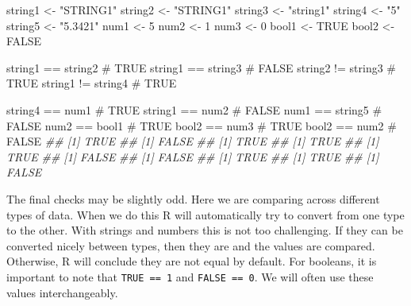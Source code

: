\documentclass[
  letterpaper,
  DIV=11,
  numbers=noendperiod]{scrreprt}
\newenvironment{Shaded}{\begin{snugshade}}{\end{snugshade}}
\newcommand{\CommentTok}[1]{\textcolor[rgb]{0.37,0.37,0.37}{#1}}
\newcommand{\ConstantTok}[1]{\textcolor[rgb]{0.56,0.35,0.01}{#1}}
\newcommand{\DecValTok}[1]{\textcolor[rgb]{0.68,0.00,0.00}{#1}}
\newcommand{\DocumentationTok}[1]{\textcolor[rgb]{0.37,0.37,0.37}{\textit{#1}}}
\newcommand{\NormalTok}[1]{\textcolor[rgb]{0.00,0.23,0.31}{#1}}
\newcommand{\OtherTok}[1]{\textcolor[rgb]{0.00,0.23,0.31}{#1}}
\newcommand{\SpecialCharTok}[1]{\textcolor[rgb]{0.37,0.37,0.37}{#1}}
\newcommand{\StringTok}[1]{\textcolor[rgb]{0.13,0.47,0.30}{#1}}
\theoremstyle{definition}
\theoremstyle{definition}
\theoremstyle{definition}
\theoremstyle{remark}
\begin{document}
\begin{Shaded}
\begin{Highlighting}[]
\NormalTok{string1 }\OtherTok{\textless{}{-}} \StringTok{"STRING1"}
\NormalTok{string2 }\OtherTok{\textless{}{-}} \StringTok{"STRING1"}
\NormalTok{string3 }\OtherTok{\textless{}{-}} \StringTok{"string1"}
\NormalTok{string4 }\OtherTok{\textless{}{-}} \StringTok{"5"}
\NormalTok{string5 }\OtherTok{\textless{}{-}} \StringTok{"5.3421"}
\NormalTok{num1 }\OtherTok{\textless{}{-}} \DecValTok{5}
\NormalTok{num2 }\OtherTok{\textless{}{-}} \DecValTok{1}
\NormalTok{num3 }\OtherTok{\textless{}{-}} \DecValTok{0}
\NormalTok{bool1 }\OtherTok{\textless{}{-}} \ConstantTok{TRUE} 
\NormalTok{bool2 }\OtherTok{\textless{}{-}} \ConstantTok{FALSE} 

\NormalTok{string1 }\SpecialCharTok{==}\NormalTok{ string2 }\CommentTok{\# TRUE}
\NormalTok{string1 }\SpecialCharTok{==}\NormalTok{ string3 }\CommentTok{\# FALSE }
\NormalTok{string2 }\SpecialCharTok{!=}\NormalTok{ string3 }\CommentTok{\# TRUE}
\NormalTok{string1 }\SpecialCharTok{!=}\NormalTok{ string4 }\CommentTok{\# TRUE }

\NormalTok{string4 }\SpecialCharTok{==}\NormalTok{ num1    }\CommentTok{\# TRUE }
\NormalTok{string1 }\SpecialCharTok{==}\NormalTok{ num2    }\CommentTok{\# FALSE}
\NormalTok{num1 }\SpecialCharTok{==}\NormalTok{ string5    }\CommentTok{\# FALSE}
\NormalTok{num2 }\SpecialCharTok{==}\NormalTok{ bool1      }\CommentTok{\# TRUE }
\NormalTok{bool2 }\SpecialCharTok{==}\NormalTok{ num3      }\CommentTok{\# TRUE }
\NormalTok{bool2 }\SpecialCharTok{==}\NormalTok{ num2      }\CommentTok{\# FALSE}
\DocumentationTok{\#\# [1] TRUE}
\DocumentationTok{\#\# [1] FALSE}
\DocumentationTok{\#\# [1] TRUE}
\DocumentationTok{\#\# [1] TRUE}
\DocumentationTok{\#\# [1] TRUE}
\DocumentationTok{\#\# [1] FALSE}
\DocumentationTok{\#\# [1] FALSE}
\DocumentationTok{\#\# [1] TRUE}
\DocumentationTok{\#\# [1] TRUE}
\DocumentationTok{\#\# [1] FALSE}
\end{Highlighting}
\end{Shaded}

The final checks may be slightly odd. Here we are comparing across
different types of data. When we do this R will automatically try to
convert from one type to the other. With strings and numbers this is not
too challenging. If they can be converted nicely between types, then
they are and the values are compared. Otherwise, R will conclude they
are not equal by default. For booleans, it is important to note that
\texttt{TRUE\ ==\ 1} and \texttt{FALSE\ ==\ 0}. We will often use these
values interchangeably.
\end{document}
